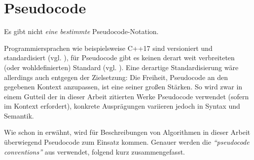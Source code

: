 \section{Pseudocode}
\label{sec:alg-spec-pseudo}

Es gibt nicht \emph{eine bestimmte} Pseudocode-Notation.

Programmiersprachen wie beispielsweise C++17 sind versioniert und standardisiert (vgl. \cite{ISO-C++17}), für Pseudocode gibt es keinen derart weit verbreiteten (oder wohldefinierten) Standard (vgl. \cite{kni1996}). Eine derartige Standardisierung wäre allerdings auch entgegen der Zielsetzung: Die Freiheit, Pseudocode an den gegebenen Kontext anzupassen, ist eine seiner großen Stärken. So wird zwar in einem Gutteil der in dieser Arbeit zitierten Werke Pseudocode verwendet (sofern im Kontext erfordert), konkrete Ausprägungen variieren jedoch in Syntax und Semantik\footnotemark.


Wie schon in  erwähnt, wird für Beschreibungen von Algorithmen in dieser Arbeit überwiegend Pseudocode zum Einsatz kommen. Genauer werden die \emph{\enquote{pseudocode conventions}} aus \cite[20-22]{clrs2001} verwendet, folgend kurz zusammengefasst.

